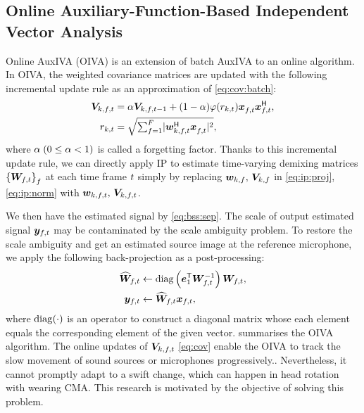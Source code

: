 \documentclass[sip,biber]{now-journal}
\begin{document}
\subsection{Online Auxiliary-Function-Based Independent Vector Analysis}\label{subsec:oiva}

Online AuxIVA (OIVA) \cite{Taniguchi:2014:HSCMA} is an extension of batch AuxIVA to an online algorithm.
In OIVA, the weighted covariance matrices are updated with the following incremental update rule as an approximation of \eqref{eq:cov:batch}:
\begin{align}
  \cov _{\src,\ft} &= \forget \cov _{\src,\ft[-1]} + (1 - \forget) \weight(\var _{\src,\tframe}) \Obs _{\ft} ^{\nohermite} \Obs _{\ft} ^{\hermite}, \label{eq:cov} \\
  \var _{\src,\tframe} &= \textstyle\sqrt{\sum _{\freq=1} ^{\Freq} \lvert \demix ^{\hermite} _{\src,\ft} \Obs ^{\nohermite}_{\ft} \rvert ^2} \label{eq:var},
\end{align}
where $\alpha\; (0 \leq \alpha < 1)$ is called a forgetting factor.
Thanks to this incremental update rule, we can directly apply IP to estimate time-varying demixing matrices ${\{\Demix _{\ft}\}} _{\freq}$ at each time frame $t$ simply by replacing $\bm{w} _{k,f},\, \bm{V} _{k,f}$ in \eqref{eq:ip:proj}, \eqref{eq:ip:norm} with $\demix _{\src,\ft},\, \cov _{\src,\ft}$.

We then have the estimated signal by \eqref{eq:bss:sep}.
The scale of output estimated signal $\Est _{\ft}$ may be contaminated by the scale ambiguity problem.
To restore the scale ambiguity and get an estimated source image at the reference microphone,
we apply the following back-projection \cite{Murata:2001:NC} as a post-processing:
\begin{align}
  \proj{\Demix} _{\ft}
    &\gets
    \diag\left(\eye _{1} ^{\top} \Demix _{\ft} ^{-1} \right) \Demix _{\ft},
    \label{eq:pb:w}
    \\
  \Est _{\ft}
    &\gets
    \proj{\Demix }_{\ft} \Obs _{\ft},
    \label{eq:pb:y}
\end{align}
where $\operatorname{diag}(\cdot)$ is an operator to construct a diagonal matrix whose each element equals the corresponding element of the given vector.
 summarises the OIVA algorithm.
The online updates of $\cov _{\src,\ft}$ \eqref{eq:cov} enable the OIVA to track the slow movement of sound sources or microphones progressively..
Nevertheless, it cannot promptly adapt to a swift change, which can happen in head rotation with wearing CMA. This research is motivated by the objective of solving this problem.
\end{document}

